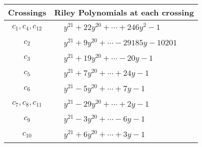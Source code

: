 \documentclass[1p]{elsarticle_modified}
\theoremstyle{definition}
\begin{document}
\begin{tabular}{m{50pt}|m{274pt}}
Crossings & \hspace{64pt}Riley Polynomials at each crossing \\
\hline $$\begin{aligned}c_{1},c_{4},c_{12}\end{aligned}$$&$\begin{aligned}
&y^{21}+22 y^{20}+\cdots+246 y^2-1
\end{aligned}$\\
\hline $$\begin{aligned}c_{2}\end{aligned}$$&$\begin{aligned}
&y^{21}+9 y^{20}+\cdots-29185 y-10201
\end{aligned}$\\
\hline $$\begin{aligned}c_{3}\end{aligned}$$&$\begin{aligned}
&y^{21}+19 y^{20}+\cdots-20 y-1
\end{aligned}$\\
\hline $$\begin{aligned}c_{5}\end{aligned}$$&$\begin{aligned}
&y^{21}+7 y^{20}+\cdots+24 y-1
\end{aligned}$\\
\hline $$\begin{aligned}c_{6}\end{aligned}$$&$\begin{aligned}
&y^{21}-5 y^{20}+\cdots+7 y-1
\end{aligned}$\\
\hline $$\begin{aligned}c_{7},c_{8},c_{11}\end{aligned}$$&$\begin{aligned}
&y^{21}-29 y^{20}+\cdots+2 y-1
\end{aligned}$\\
\hline $$\begin{aligned}c_{9}\end{aligned}$$&$\begin{aligned}
&y^{21}-3 y^{20}+\cdots-6 y-1
\end{aligned}$\\
\hline $$\begin{aligned}c_{10}\end{aligned}$$&$\begin{aligned}
&y^{21}+6 y^{20}+\cdots+3 y-1
\end{aligned}$\\
\hline
\end{tabular}\\~\\
\end{document}
